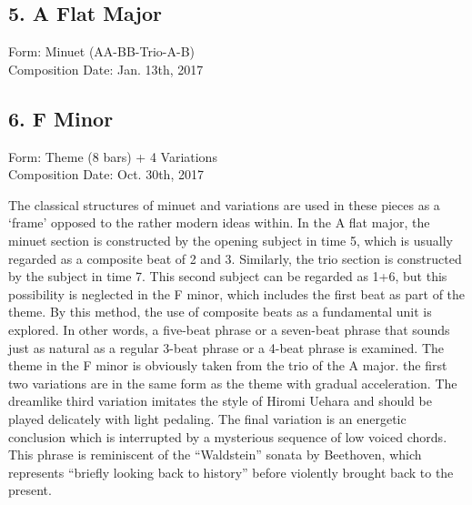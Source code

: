 \documentclass{jarticle}
\begin{document}
\subsection*{5. A Flat Major}
Form: Minuet (AA-BB-Trio-A-B) \\
Composition Date: Jan. 13th, 2017


\subsection*{6. F Minor}
Form: Theme (8 bars) + 4 Variations \\
Composition Date: Oct. 30th, 2017

The classical structures of minuet and variations are used in these pieces as a `frame' opposed to the rather modern ideas within. In the  A flat major, the minuet section is constructed by the opening subject in time 5, which is usually regarded as a composite beat of 2 and 3. Similarly, the trio section is constructed by the subject in time 7. This second subject can be regarded as 1+6, but this possibility is neglected in the F minor, which includes the first beat as part of the theme. By this method, the use of composite beats as a fundamental unit is explored. In other words, a five-beat phrase or a seven-beat phrase that sounds just as natural as a regular 3-beat phrase or a 4-beat phrase is examined. The theme in the F minor is obviously taken from the trio of the A major. the first two variations are in the same form as the theme with gradual acceleration. The dreamlike third variation imitates the style of Hiromi Uehara and should be played delicately with light pedaling. The final variation is an energetic conclusion which is interrupted by a mysterious sequence of low voiced chords. This phrase is reminiscent of the ``Waldstein'' sonata by Beethoven, which represents  ``briefly looking back to history'' before violently brought back to the present.\\
\end{document}
